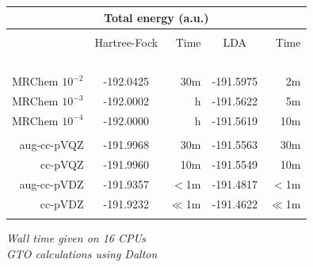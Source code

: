 \begin{frame}
\begin{table}
    \centering
    \begin{tabular}{r|cr|cr}
    \multicolumn{5}{c}{\textbf{Total energy (a.u.)}}\\
    \hline               
    \hline               
                     &               &               &               &               \\
                     &Hartree-Fock   &Time           &LDA            &Time           \\
    \hspace{20mm}\   &\hspace{20mm}\ &\hspace{05mm}\ &\hspace{20mm}\ &\hspace{05mm}\ \\
    MRChem $10^{-2}$ & -192.0425     &  30m          & -191.5975     &   2m          \\
    MRChem $10^{-3}$ & -192.0002     &    h          & -191.5622     &   5m          \\
    MRChem $10^{-4}$ & -192.0000     &    h          & -191.5619     &  10m          \\
                     &               &               &               &               \\
    aug-cc-pVQZ      & -191.9968     &  30m          & -191.5563     &  30m          \\
        cc-pVQZ      & -191.9960     &  10m          & -191.5549     &  10m          \\
    aug-cc-pVDZ      & -191.9357     &  $<$1m        & -191.4817     &  $<$1m        \\
        cc-pVDZ      & -191.9232     &  $\ll$1m      & -191.4622     &  $\ll$1m      \\
                     &               &               &               &               \\
    \hline
    \hline
    \end{tabular}
\end{table}

\centering
\it{Wall time given on 16 CPUs}\\
\it{GTO calculations using Dalton}

\end{frame}

